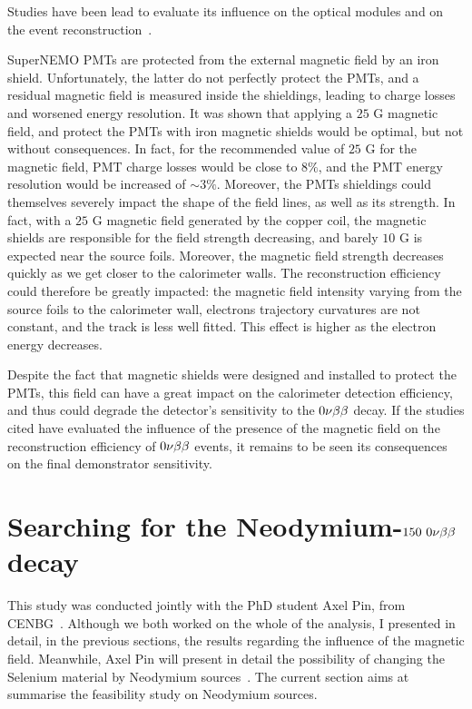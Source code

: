 Studies have been lead to evaluate its influence on the optical modules and on the event reconstruction~\cite{CalvezThesis}\cite{internal:magnetic_field}.

SuperNEMO PMTs are protected from the external magnetic field by an iron shield.
Unfortunately, the latter do not perfectly protect the PMTs, and a residual magnetic field is measured inside the shieldings, leading to charge losses and worsened energy resolution.
It was shown that applying a $25$ G magnetic field, and protect the PMTs with iron magnetic shields would be optimal, but not without consequences.
In fact, for the recommended value of $25$ G for the magnetic field, PMT charge losses would be close to $8\%$, and the PMT energy resolution would be increased of $\sim 3\%$.
Moreover, the PMTs shieldings could themselves severely impact the shape of the field lines, as well as its strength.
In fact, with a $25$ G magnetic field generated by the copper coil, the magnetic shields are responsible for the field strength decreasing, and barely $10$ G is expected near the source foils.
Moreover, the magnetic field strength decreases quickly as we get closer to the calorimeter walls.
The reconstruction efficiency could therefore be greatly impacted:
the magnetic field intensity varying from the source foils to the calorimeter wall, electrons trajectory curvatures are not constant, and the track is less well fitted.
This effect is higher as the electron energy decreases.

Despite the fact that magnetic shields were designed and installed to protect the PMTs, this field can have a great impact on the calorimeter detection efficiency, and thus could degrade the detector's sensitivity to the $0\nu\beta\beta$ decay.
If the studies cited have evaluated the influence of the presence of the magnetic field on the reconstruction efficiency of $0\nu\beta\beta$ events, it remains to be seen its consequences on the final demonstrator sensitivity.



\section{Searching for the Neodymium-$150~0\nu\beta\beta$ decay}
\label{sec:Nd}

This study was conducted jointly with the PhD student Axel Pin, from CENBG~\cite{}.
Although we both worked on the whole of the analysis, I presented in detail, in the previous sections, the results regarding the influence of the magnetic field.
Meanwhile, Axel Pin will present in detail the possibility of changing the Selenium material by Neodymium sources~\cite{AxelThesis}.
The current section aims at summarise the feasibility study on Neodymium sources.

